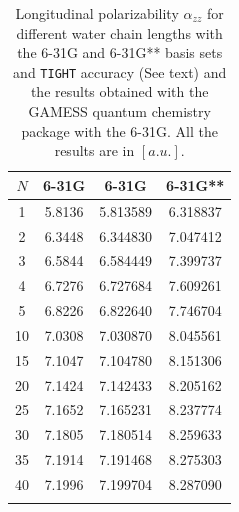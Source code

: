 \documentclass[prl,aps,twocolumn,showpacs,twocolumngrid,superbib]{revtex4}
\begin{document}
\begin{table}[t]
  \centering
  \caption{\protect
    Longitudinal polarizability $\alpha_{zz}$
    for different water chain lengths with the 6-31G and 6-31G** basis sets
    and {\tt TIGHT} accuracy (See text) and the results obtained with
    the GAMESS quantum chemistry package \cite{gamess} with the 6-31G. 
    All the results are in $[a.u.]$.
  }\label{tab:Alpha_1D_Values}
  \begin{tabular}{cccc}
    \toprule
    $N$ &\multicolumn{1}{c}{6-31G\footnotemark[1]}
    &\multicolumn{1}{c}{6-31G\footnotemark[2]}
    &\multicolumn{1}{c}{6-31G**\footnotemark[2]}\\
    \hline
     1 & 5.8136 & 5.813589 & 6.318837     \\
     2 & 6.3448 & 6.344830 & 7.047412     \\
     3 & 6.5844 & 6.584449 & 7.399737     \\
     4 & 6.7276 & 6.727684 & 7.609261     \\
     5 & 6.8226 & 6.822640 & 7.746704     \\
    10 & 7.0308 & 7.030870 & 8.045561     \\
    15 & 7.1047 & 7.104780 & 8.151306     \\
    20 & 7.1424 & 7.142433 & 8.205162     \\
    25 & 7.1652 & 7.165231 & 8.237774     \\
    30 & 7.1805 & 7.180514 & 8.259633     \\
    35 & 7.1914 & 7.191468 & 8.275303     \\
    40 & 7.1996 & 7.199704 & 8.287090     \\
    \botrule
  \end{tabular}
\end{table}
\end{document}
